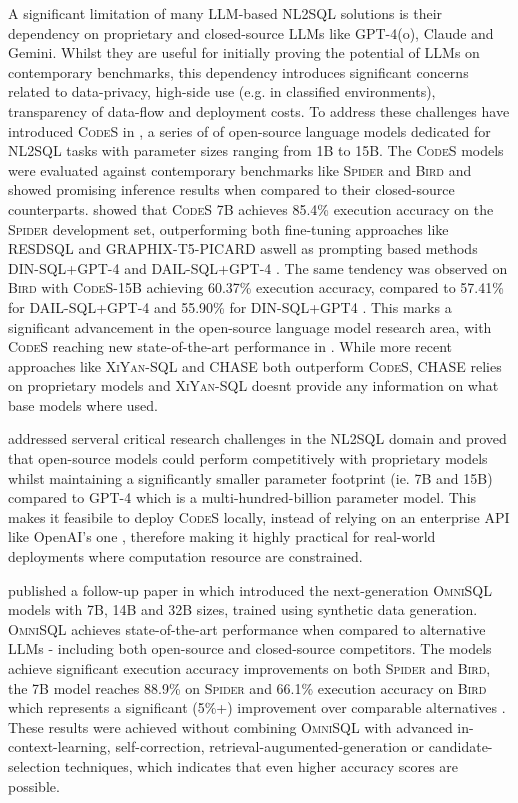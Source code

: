 \documentclass{article}
\begin{document}
A significant limitation of many LLM-based NL2SQL solutions is their dependency on proprietary and closed-source
LLMs like GPT-4(o), Claude and Gemini. Whilst they are useful for initially proving the potential of LLMs on
contemporary benchmarks, this dependency introduces significant concerns related to data-privacy, high-side use 
(e.g. in classified environments), transparency of data-flow and deployment costs. To address these challenges
\cite{CodeS} have introduced \textsc{CodeS} in \citeyear{CodeS}, a series of of open-source language models dedicated
for NL2SQL tasks with parameter sizes ranging from 1B to 15B. The \textsc{CodeS} models were evaluated against
contemporary benchmarks like \textsc{Spider} and \textsc{Bird} and showed promising inference results when compared
to their closed-source counterparts. \cite{CodeS} showed that \textsc{CodeS} 7B achieves 85.4\% execution accuracy
on the \textsc{Spider} development set, outperforming both fine-tuning approaches like RESDSQL and GRAPHIX-T5-PICARD
aswell as prompting based methods DIN-SQL+GPT-4 and DAIL-SQL+GPT-4 \citep{CodeS}. The same tendency was observed
on \textsc{Bird} with \textsc{CodeS}-15B achieving 60.37\% execution accuracy, compared to 57.41\% for DAIL-SQL+GPT-4
and 55.90\% for DIN-SQL+GPT4 \citep{CodeS}. This marks a significant advancement in the open-source language model
research area, with \textsc{CodeS} reaching new state-of-the-art performance in \citeyear{CodeS}. While more recent
approaches like \textsc{XiYan-SQL} and CHASE both outperform \textsc{CodeS}, CHASE relies on proprietary models and
\textsc{XiYan-SQL} doesnt provide any information on what base models where used.

\cite{CodeS} addressed serveral critical research challenges in the NL2SQL domain and proved that open-source models
could perform competitively with proprietary models whilst maintaining a significantly smaller parameter footprint
(ie. 7B and 15B) compared to GPT-4 which is a multi-hundred-billion parameter model. This makes it feasibile to deploy
\textsc{CodeS} locally, instead of relying on an enterprise API like OpenAI's one \citep{CodeS}, therefore making it
highly practical for real-world deployments where computation resource are constrained. 

\citeauthor*{OmniSQL} published a follow-up paper in \citeyear{OmniSQL} which introduced the next-generation \textsc{OmniSQL}
models with 7B, 14B and 32B sizes, trained using synthetic data generation. \textsc{OmniSQL} achieves state-of-the-art
performance when compared to alternative LLMs - including both open-source and closed-source competitors. The models
achieve significant execution accuracy improvements on both \textsc{Spider} and \textsc{Bird}, the 7B model reaches 88.9\%
on \textsc{Spider} and 66.1\% execution accuracy on \textsc{Bird} which represents a significant (5\%+) improvement over
comparable alternatives \citep{OmniSQL}. These results were achieved without combining \textsc{OmniSQL} with advanced
in-context-learning, self-correction, retrieval-augumented-generation or candidate-selection techniques, which indicates
that even higher accuracy scores are possible.
\end{document}
